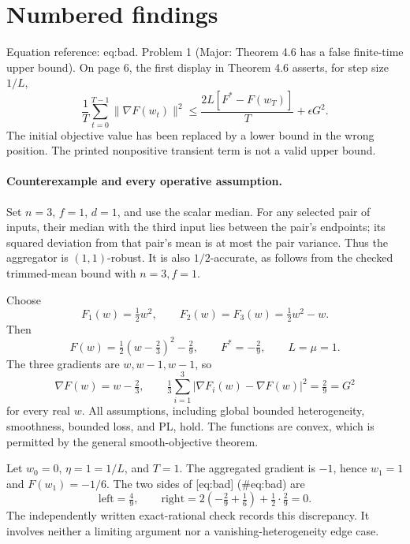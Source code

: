 \documentclass[10pt]{article}
\begin{document}
\section*{Numbered findings}
Equation reference: eq:bad. Problem 1 (Major: Theorem 4.6 has a false finite-time upper bound).  On page 6, the first display in Theorem 4.6 asserts, for step size \(1/L\), \[
 \frac1T\sum_{t=0}^{T-1}\|\nabla F(w_t)\|^2
 \leq \frac{2L[F^*-F(w_T)]}{T}+\epsilon G^2 .\] The initial objective value has been replaced by a lower bound in the wrong position. The printed nonpositive transient term is not a valid upper bound.\par
\paragraph*{Counterexample and every operative assumption.}\mbox{}\par
Set \(n=3\), \(f=1\), \(d=1\), and use the scalar median. For any selected pair of inputs, their median with the third input lies between the pair’s endpoints; its squared deviation from that pair’s mean is at most the pair variance. Thus the aggregator is \((1,1)\)-robust. It is also \(1/2\)-accurate, as follows from the checked trimmed-mean bound with \(n=3,f=1\).\par
Choose \[F_1(w)=\tfrac12w^2,\qquad F_2(w)=F_3(w)=\tfrac12w^2-w .\] Then \[F(w)=\tfrac12(w-\tfrac23)^2-\tfrac29,\qquad
 F^*=-\tfrac29,\qquad L=\mu=1 .\] The three gradients are \(w,w-1,w-1\), so \[\nabla F(w)=w-\tfrac23,\qquad
 \tfrac13\sum_{i=1}^{3}|\nabla F_i(w)-\nabla F(w)|^2=\tfrac29=G^2\] for every real \(w\). All assumptions, including global bounded heterogeneity, smoothness, bounded loss, and PL, hold. The functions are convex, which is permitted by the general smooth-objective theorem.\par
Let \(w_0=0\), \(\eta=1=1/L\), and \(T=1\). The aggregated gradient is \(-1\), hence \(w_1=1\) and \(F(w_1)=-1/6\). The two sides of [eq:bad] (\#eq:bad) are \[\text{left}=\tfrac49,\qquad
 \text{right}=2(-\tfrac29+\tfrac16)+\tfrac12\cdot\tfrac29=0 .\] The independently written exact-rational check records this discrepancy. It involves neither a limiting argument nor a vanishing-heterogeneity edge case.\par
\end{document}
